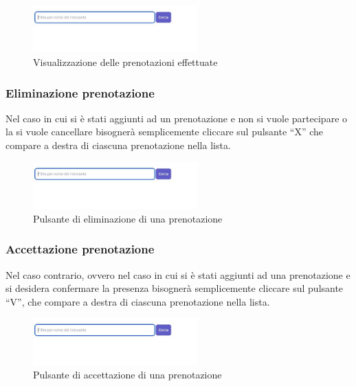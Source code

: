 \begin{figure}[htbp]
    \centering
    \includegraphics[width=0.5625\textwidth]{./img/Dettaglio.jpg}
    \caption{Visualizzazione delle prenotazioni effettuate}
\end{figure}

\subsubsection{Eliminazione prenotazione}
Nel caso in cui si è stati aggiunti ad un prenotazione e non si vuole partecipare o la si vuole cancellare bisognerà semplicemente cliccare sul pulsante ``X'' 
che compare a destra di ciascuna prenotazione nella lista.

\begin{figure}[htbp]
    \centering
    \includegraphics[width=0.5625\textwidth]{./img/Dettaglio.jpg}
    \caption{Pulsante di eliminazione di una prenotazione}
\end{figure}

\subsubsection{Accettazione prenotazione}
Nel caso contrario, ovvero nel caso in cui si è stati aggiunti ad una prenotazione e si desidera confermare la presenza bisognerà semplicemente cliccare sul pulsante ``V'', 
che compare a destra di ciascuna prenotazione nella lista.

\begin{figure}[htbp]
    \centering
    \includegraphics[width=0.5625\textwidth]{./img/Dettaglio.jpg}
    \caption{Pulsante di accettazione di una prenotazione}
\end{figure}

